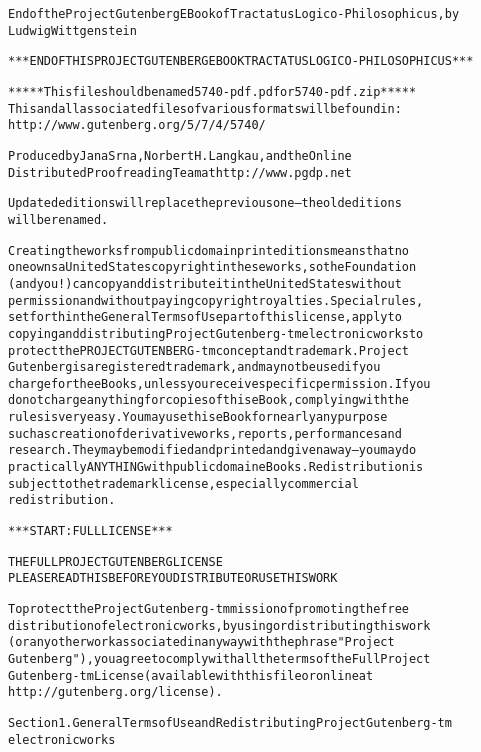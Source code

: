 \documentclass[12pt,oneside]{book}[2007/10/19]
\newenvironment{PGtext}{%
  \begin{alltt}
  \fontsize{9}{10}\ttfamily\selectfont}%
  {\end{alltt}%
}
\begin{document}
\pagestyle{plain}
\begin{PGtext}
End of the Project Gutenberg EBook of Tractatus Logico-Philosophicus, by 
Ludwig Wittgenstein

*** END OF THIS PROJECT GUTENBERG EBOOK TRACTATUS LOGICO-PHILOSOPHICUS ***

***** This file should be named 5740-pdf.pdf or 5740-pdf.zip *****
This and all associated files of various formats will be found in:
        http://www.gutenberg.org/5/7/4/5740/

Produced by Jana Srna, Norbert H. Langkau, and the Online
Distributed Proofreading Team at http://www.pgdp.net


Updated editions will replace the previous one--the old editions
will be renamed.

Creating the works from public domain print editions means that no
one owns a United States copyright in these works, so the Foundation
(and you!) can copy and distribute it in the United States without
permission and without paying copyright royalties.  Special rules,
set forth in the General Terms of Use part of this license, apply to
copying and distributing Project Gutenberg-tm electronic works to
protect the PROJECT GUTENBERG-tm concept and trademark.  Project
Gutenberg is a registered trademark, and may not be used if you
charge for the eBooks, unless you receive specific permission.  If you
do not charge anything for copies of this eBook, complying with the
rules is very easy.  You may use this eBook for nearly any purpose
such as creation of derivative works, reports, performances and
research.  They may be modified and printed and given away--you may do
practically ANYTHING with public domain eBooks.  Redistribution is
subject to the trademark license, especially commercial
redistribution.



*** START: FULL LICENSE ***

THE FULL PROJECT GUTENBERG LICENSE
PLEASE READ THIS BEFORE YOU DISTRIBUTE OR USE THIS WORK

To protect the Project Gutenberg-tm mission of promoting the free
distribution of electronic works, by using or distributing this work
(or any other work associated in any way with the phrase "Project
Gutenberg"), you agree to comply with all the terms of the Full Project
Gutenberg-tm License (available with this file or online at
http://gutenberg.org/license).


Section 1.  General Terms of Use and Redistributing Project Gutenberg-tm
electronic works


\end{PGtext}
\end{document}
